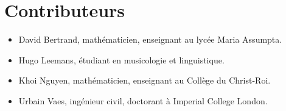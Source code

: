 \section*{Contributeurs}

\begin{itemize}
    \item David Bertrand, mathématicien, enseignant au lycée Maria Assumpta.
    \item Hugo Leemans, étudiant en musicologie et linguistique.
    \item Khoi Nguyen, mathématicien, enseignant au Collège du Christ-Roi.
    \item Urbain Vaes, ingénieur civil, doctorant à Imperial College London.
\end{itemize}
